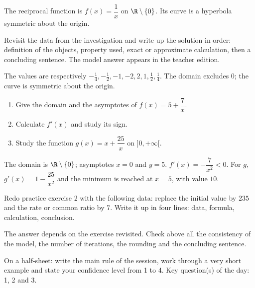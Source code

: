 \begin{summary}The reciprocal function is $f(x)=\dfrac1x$ on $\R\setminus\{0\}$. Its curve is a hyperbola symmetric about the origin.\end{summary}

\begin{example}
Revisit the data from the investigation and write up the solution in order: definition of the objects, property used, exact or approximate calculation, then a concluding sentence. The model answer appears in the teacher edition.
\end{example}
\begin{solution}The values are respectively $-\frac14,-\frac12,-1,-2,2,1,\frac12,\frac14$. The domain excludes $0$; the curve is symmetric about the origin.\end{solution}

\begin{exercise}[essential]
\begin{enumerate}\item Give the domain and the asymptotes of $f(x)=5+\dfrac{7}x$.\item Calculate $f'(x)$ and study its sign.\item Study the function $g(x)=x+\dfrac{25}x$ on $]0,+\infty[$.\end{enumerate}
\end{exercise}
\begin{solution}The domain is $\R\setminus\{0\}$; asymptotes $x=0$ and $y=5$. $f'(x)=-\dfrac{7}{x^2}<0$. For $g$, $g'(x)=1-\dfrac{25}{x^2}$ and the minimum is reached at $x=5$, with value $10$.\end{solution}


\begin{homework}Redo practice exercise 2 with the following data: replace the initial value by $235$ and the rate or common ratio by $7$. Write it up in four lines: data, formula, calculation, conclusion.\end{homework}
\begin{solution}The answer depends on the exercise revisited. Check above all the consistency of the model, the number of iterations, the rounding and the concluding sentence.\end{solution}

\begin{exitticket}[3 minutes]On a half-sheet: write the main rule of the session, work through a very short example and state your confidence level from 1 to 4. Key question(s) of the day: 1, 2 and 3.\end{exitticket}

